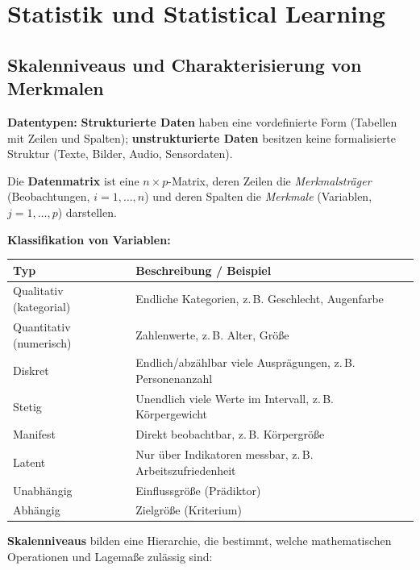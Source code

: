 \section{Statistik und Statistical Learning}

\subsection{Skalenniveaus und Charakterisierung von Merkmalen}

\textbf{Datentypen:}
\textbf{Strukturierte Daten} haben eine vordefinierte Form (Tabellen mit Zeilen und Spalten);
\textbf{unstrukturierte Daten} besitzen keine formalisierte Struktur (Texte, Bilder, Audio, Sensordaten).

\medskip
\noindent Die \textbf{Datenmatrix} ist eine $n \times p$-Matrix, deren Zeilen die \emph{Merkmalsträger} (Beobachtungen, $i=1,\ldots,n$) und deren Spalten die \emph{Merkmale} (Variablen, $j=1,\ldots,p$) darstellen.

\medskip
\noindent\textbf{Klassifikation von Variablen:}

\begin{center}
\small
\begin{tabular}{|l|l|}
\hline
\textbf{Typ} & \textbf{Beschreibung / Beispiel} \\
\hline
Qualitativ (kategorial) & Endliche Kategorien, z.\,B. Geschlecht, Augenfarbe \\
Quantitativ (numerisch) & Zahlenwerte, z.\,B. Alter, Größe \\
Diskret & Endlich/abzählbar viele Ausprägungen, z.\,B. Personenanzahl \\
Stetig & Unendlich viele Werte im Intervall, z.\,B. Körpergewicht \\
Manifest & Direkt beobachtbar, z.\,B. Körpergröße \\
Latent & Nur über Indikatoren messbar, z.\,B. Arbeitszufriedenheit \\
Unabhängig & Einflussgröße (Prädiktor) \\
Abhängig & Zielgröße (Kriterium) \\
\hline
\end{tabular}
\end{center}

\medskip
\noindent\textbf{Skalenniveaus} bilden eine Hierarchie, die bestimmt, welche mathematischen Operationen und Lagemaße zulässig sind:

